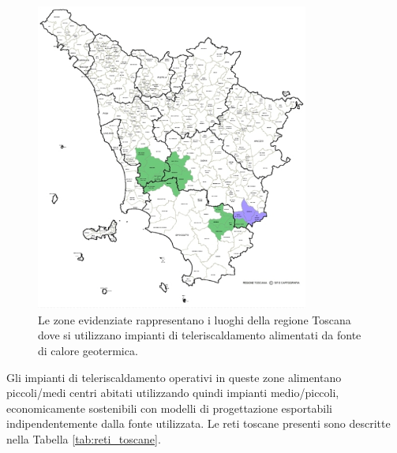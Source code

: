 \documentclass[laurea,oneside,11pt]{USiena_tesiLM}
\begin{document}
\begin{figure}[!ht]
\centering
\includegraphics[width=0.8\textwidth]{figure/toscana}
\caption{Le zone evidenziate rappresentano i luoghi della regione Toscana dove si utilizzano impianti di teleriscaldamento alimentati da fonte di calore geotermica.}
\label{fig:toscana}
\end{figure}

Gli impianti di teleriscaldamento operativi in queste zone alimentano  piccoli/medi centri abitati utilizzando quindi impianti medio/piccoli, economicamente sostenibili con modelli di progettazione esportabili indipendentemente dalla fonte utilizzata. Le reti toscane presenti sono descritte nella Tabella \ref{tab:reti_toscane}.
\end{document}
